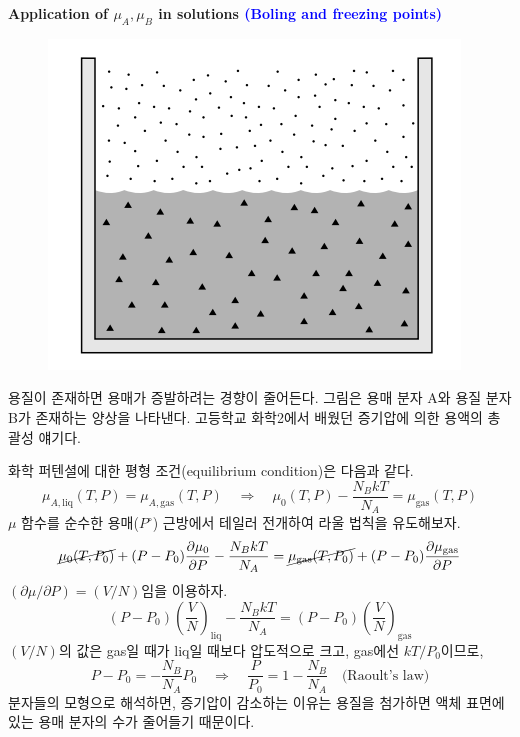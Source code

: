 \documentclass{article}
\begin{document}
\newpage

\noindent
\textbf{Application of $\mu_A, \mu_B$ in solutions \textcolor{blue}{(Boling and freezing points)}}

\begin{figure}[h]
    \centering
    \includegraphics[width=0.3\linewidth]{images/fig5_3.png}
\end{figure}

용질이 존재하면 용매가 증발하려는 경향이 줄어든다. 그림은 용매 분자 A와 용질 분자 B가 존재하는 양상을 나타낸다. 고등학교 화학2에서 배웠던 증기압에 의한 용액의 총괄성 얘기다.

화학 퍼텐셜에 대한 평형 조건(equilibrium condition)은 다음과 같다. 
\begin{equation}
    \mu_{A,\mathrm{liq}}(T, P) = \mu_{A,\mathrm{gas}}(T, P) \quad \Rightarrow \quad \mu_0(T, P) - \frac{N_B k T}{N_A} = \mu_{\mathrm{gas}}(T, P)
\end{equation}
$\mu$ 함수를 순수한 용매($P^\circ$) 근방에서 테일러 전개하여 라울 법칙을 유도해보자.
\begin{equation}
    \cancel{\mu_0 (T,P_0)} + (P - P_0) \frac{\partial \mu_0}{\partial P} - \frac{N_B kT}{N_A} = \cancel{\mu_\text{gas} (T,P_0)} + (P -P_0) \frac{\partial \mu_\text{gas}}{\partial P}
\end{equation}
$(\partial \mu / \partial P) = (V/N)$임을 이용하자.
\begin{equation}
    (P - P_0) \left( \frac{V}{N} \right)_{\text{liq}} - \frac{N_B kT }{N_A} = (P - P_0) \left( \frac{V}{N} \right)_{\text{gas}}
\end{equation}
$(V/N)$의 값은 gas일 때가 liq일 때보다 압도적으로 크고, gas에선 $kT/P_0$이므로,
\begin{equation}
    P - P_0 = -\frac{N_B}{N_A} P_0 \quad \Rightarrow \quad \boxed{\frac{P}{P_0} = 1-\frac{N_B}{N_A}} \quad \text{(Raoult's law)}
\end{equation}
분자들의 모형으로 해석하면, 증기압이 감소하는 이유는 용질을 첨가하면 액체 표면에 있는 용매 분자의 수가 줄어들기 때문이다.
\end{document}

